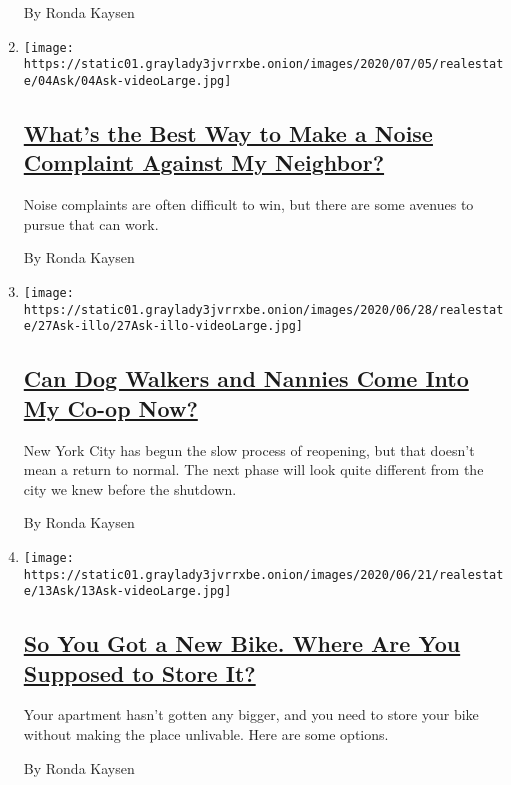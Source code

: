 \begin{enumerate}
  By Ronda Kaysen
\item
  \texttt{[image: https://static01.graylady3jvrrxbe.onion/images/2020/07/05/realestate/04Ask/04Ask-videoLarge.jpg]}

  \hypertarget{whats-the-best-way-to-make-a-noise-complaint-against-my-neighbor}{%
  \subsection{\texorpdfstring{\href{/2020/07/04/realestate/whats-the-best-way-to-make-a-noise-complaint-against-my-neighbor.html}{What's
  the Best Way to Make a Noise Complaint Against My
  Neighbor?}}{What's the Best Way to Make a Noise Complaint Against My Neighbor?}}\label{whats-the-best-way-to-make-a-noise-complaint-against-my-neighbor}}

  Noise complaints are often difficult to win, but there are some
  avenues to pursue that can work.

  By Ronda Kaysen
\item
  \texttt{[image: https://static01.graylady3jvrrxbe.onion/images/2020/06/28/realestate/27Ask-illo/27Ask-illo-videoLarge.jpg]}

  \hypertarget{can-dog-walkers-and-nannies-come-into-my-co-op-now}{%
  \subsection{\texorpdfstring{\href{/2020/06/29/realestate/coronavirus-phase-2-dog-walkers-nannies-co-op.html}{Can
  Dog Walkers and Nannies Come Into My Co-op
  Now?}}{Can Dog Walkers and Nannies Come Into My Co-op Now?}}\label{can-dog-walkers-and-nannies-come-into-my-co-op-now}}

  New York City has begun the slow process of reopening, but that
  doesn't mean a return to normal. The next phase will look quite
  different from the city we knew before the shutdown.

  By Ronda Kaysen
\item
  \texttt{[image: https://static01.graylady3jvrrxbe.onion/images/2020/06/21/realestate/13Ask/13Ask-videoLarge.jpg]}

  \hypertarget{so-you-got-a-new-bike-where-are-you-supposed-to-store-it}{%
  \subsection{\texorpdfstring{\href{/2020/06/20/realestate/bike-bicycle-rack-apartment-storage-coronavirus.html}{So
  You Got a New Bike. Where Are You Supposed to Store
  It?}}{So You Got a New Bike. Where Are You Supposed to Store It?}}\label{so-you-got-a-new-bike-where-are-you-supposed-to-store-it}}

  Your apartment hasn't gotten any bigger, and you need to store your
  bike without making the place unlivable. Here are some options.

  By Ronda Kaysen
\end{enumerate}

